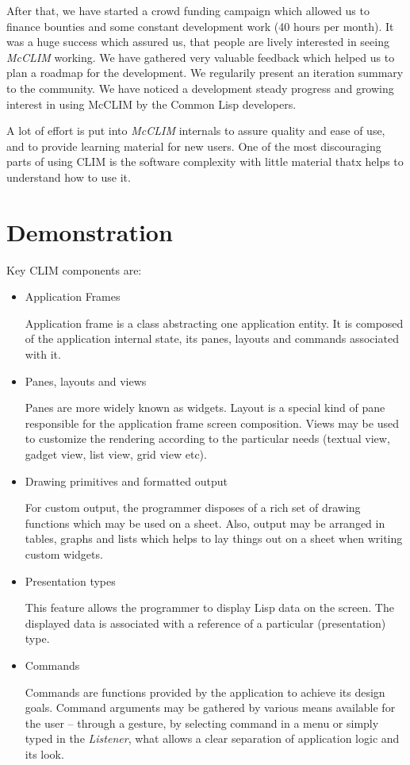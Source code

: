 \documentclass{sig-alternate-05-2015}
\begin{document}
After that, we have started a crowd funding campaign which allowed us
to finance bounties and some constant development work (40 hours per
month). It was a huge success which assured us, that people are lively
interested in seeing \emph{McCLIM} working. We have gathered very
valuable feedback which helped us to plan a roadmap\cite{roadmap} for
the development. We regularily present an iteration summary to the
community. We have noticed a development steady progress and growing
interest in using McCLIM by the Common Lisp developers.

A lot of effort is put into \emph{McCLIM} internals to assure quality
and ease of use, and to provide learning material for new users. One
of the most discouraging parts of using CLIM is the software
complexity with little material\cite{guided} thatx helps to understand
how to use it.
\section{Demonstration}

Key CLIM components are:

\begin{itemize}
\item Application Frames

  Application frame is a class abstracting one application entity. It
  is composed of the application internal state, its panes, layouts
  and commands associated with it.

\item Panes, layouts and views

  Panes are more widely known as widgets. Layout is a special kind of
  pane responsible for the application frame screen composition. Views
  may be used to customize the rendering according to the particular
  needs (textual view, gadget view, list view, grid view etc).

\item Drawing primitives and formatted output

  For custom output, the programmer disposes of a rich set of drawing
  functions which may be used on a sheet. Also, output may be arranged
  in tables, graphs and lists which helps to lay things out on a sheet
  when writing custom widgets.

\item Presentation types

  This feature allows the programmer to display Lisp data on the
  screen.  The displayed data is associated with a reference of a
  particular (presentation) type.

\item Commands

  Commands are functions provided by the application to achieve its
  design goals. Command arguments may be gathered by various means
  available for the user – through a gesture, by selecting command in
  a menu or simply typed in the \emph{Listener}\cite{listener}, what
  allows a clear separation of application logic and its look.
\end{itemize}
\end{document}
